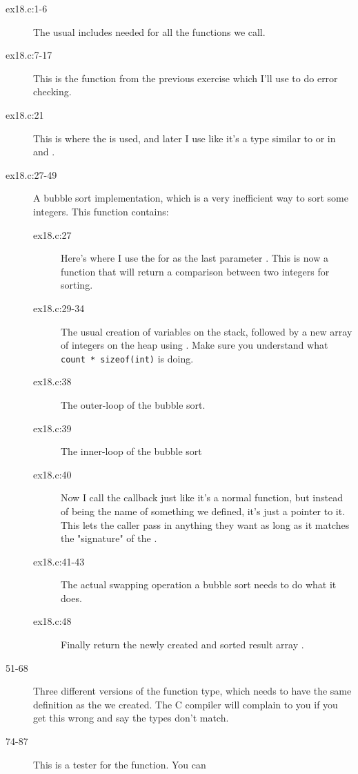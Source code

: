 \begin{description}
\item[ex18.c:1-6] The usual includes needed for all the functions we call.
\item[ex18.c:7-17] This is the  function from the previous exercise
    which I'll use to do error checking.
\item[ex18.c:21] This is where the  is used, and later I use 
     like it's a type similar to  or 
     in  and .
\item[ex18.c:27-49] A bubble sort implementation, which is a very inefficient way
    to sort some integers.  This function contains:
    \begin{description}
    \item[ex18.c:27] Here's where I use the  for 
        as the last parameter .  This is now a function that will
        return a comparison between two integers for sorting.
    \item[ex18.c:29-34] The usual creation of variables on the stack, followed by
    a new array of integers on the heap using .  Make sure you
    understand what \verb|count * sizeof(int)| is doing.
    \item[ex18.c:38] The outer-loop of the bubble sort.
    \item[ex18.c:39] The inner-loop of the bubble sort
    \item[ex18.c:40] Now I call the  callback just like it's a normal
        function, but instead of being the name of something we defined, 
        it's just a pointer to it.  This lets the caller pass in anything
        they want as long as it matches the "signature" of the 
        .
    \item[ex18.c:41-43] The actual swapping operation a bubble sort needs to do what it
        does.
    \item[ex18.c:48] Finally return the newly created and sorted result array .
    \end{description}
\item [51-68] Three different versions of the  function type,
    which needs to have the same definition as the  we created.
    The C compiler will complain to you if you get this wrong and say the types don't
    match.
\item [74-87] This is a tester for the  function.  You can 

\end{description}
